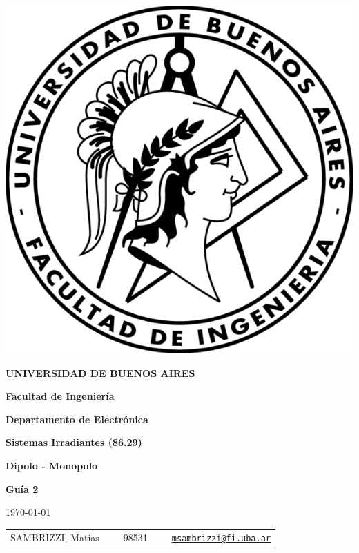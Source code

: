 \begin{titlepage}

\thispagestyle{empty}

\begin{center}

\includegraphics[scale=1.2]{Logo_Fiuba2.png}

\bigskip
\textbf{UNIVERSIDAD DE BUENOS AIRES}

\smallskip

\textbf{Facultad de Ingeniería}

\smallskip

\textbf{Departamento de Electrónica}

\vspace{2cm}

\textbf{\Large{Sistemas Irradiantes (86.29)}}

\vspace{1cm}

\textbf{\large{Dipolo - Monopolo}}

\vspace{0.5cm}

\textbf{\large{Guía 2}}

\vspace{1cm}

\today

\vspace{1cm}

\begin{tabular}{lcl}
SAMBRIZZI, Matias & \ \ \ 98531 & \ \ \ 
\texttt{\href{mailto:msambrizzi@fi.uba.ar}{msambrizzi@fi.uba.ar}}\\
\end{tabular}

\end {center}

\end{titlepage}
\newpage
